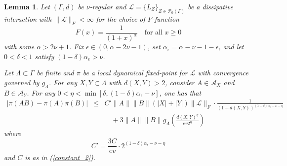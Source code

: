 \documentclass{article}
\newcommand{\A}{\mathcal{A}}
\newcommand{\<}{\langle}
\renewcommand{\>}{\rangle}
\numberwithin{equation}{section}
\newtheorem{lem}[thm]{Lemma}
\theoremstyle{definition}
\begin{document}
\begin{lem}  \label{lem:poly_cor_dec_2} Let $(\Gamma, d)$ be $\nu$-regular and $\mathscr{L} = \{L_Z \}_{Z \in \mathcal{P}_0(\Gamma)}$ be a dissipative interaction with
$\| \mathscr{L} \|_F< \infty$ for the choice of $F$-function
\begin{equation} \label{power_law_F_2}
F(x) = \frac{1}{(1+x)^{\alpha}} \quad \mbox{for all } x \geq 0
\end{equation}
with some $\alpha > 2\nu +1$. Fix $\epsilon \in (0, \alpha - 2 \nu -1)$, set $\alpha_{\epsilon} = \alpha - \nu - 1- \epsilon$, and 
let $0 < \delta < 1$ satisfy $(1- \delta)\alpha_{\epsilon} > \nu$. 

Let $\Lambda \subset \Gamma$ be finite and $\pi$ be a local dynamical fixed-point for $\mathscr{L}$ with 
convergence governed by $g_{\Lambda}$. For any $X,Y \subset \Lambda$ with $d(X,Y)>2$, consider $A \in \A_X$ and $B\in \A_Y$. 
For any $0< \eta < \min[ \delta, (1-\delta) \alpha_{\epsilon} - \nu]$, one has that
\begin{eqnarray}\label{eqn:dss_power_law}
|\pi(AB) - \pi(A) \pi(B)| & \le &  C'\|A\| \|B\| (|X|+|Y|) \| \mathscr{L} \|_F \cdot \frac{1}{(1+d(X,Y))^{(1-\delta)\alpha_\epsilon - \nu-\eta}}  \nonumber \\
& \mbox{ } & \quad + 3 \| A \| \| B \| g_{\Lambda} \left( \frac{d(X,Y)^{\eta}}{ev2^{\eta}} \right) 
\end{eqnarray}
where 
\begin{equation}
C' = \frac{3C}{ev} \cdot 2^{(1- \delta) \alpha_{\epsilon} - \nu - \eta}
\end{equation}
and $C$ is as in (\ref{constant_2}).
\end{lem}
\end{document}
